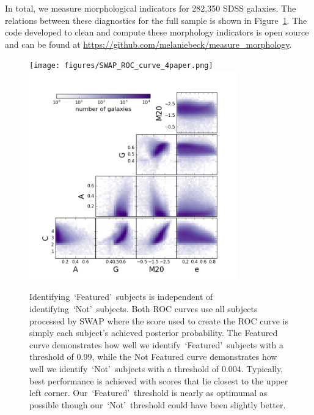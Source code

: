 \documentclass[twocolumn]{aastex6}
\newcommand{\feat}{`Featured'}
\newcommand{\notfeat}{`Not'}
\begin{document}
In total, we measure morphological indicators for 282,350 SDSS galaxies. The relations between these diagnostics for the full sample is shown in Figure~\ref{fig: morph thresh}. The code developed to clean and compute these morphology indicators is open source and can be found at \url{https://github.com/melaniebeck/measure_morphology}.

\begin{figure}[t!]

\texttt{[image: figures/SWAP\_ROC\_curve\_4paper.png]}
\includegraphics[width=3.55in]{figures/morph_params_entire_GZ2_sample.png}
\caption{Identifying~\feat~subjects is independent of identifying~\notfeat~subjects.  Both ROC curves use all subjects processed by SWAP where the score used to create the ROC curve is simply each subject's achieved posterior probability. The Featured curve demonstrates how well we identify~\feat~subjects with a threshold of 0.99, while the Not Featured curve demonstrates how well we identify~\notfeat~subjects with a threshold of 0.004. Typically, best performance is achieved with scores that lie closest to the upper left corner.  Our~\feat~threshold is nearly as optimumal as possible though our~\notfeat~threshold could have been slightly better. \label{fig: retirement thresholds}}
\label{fig: morph thresh}
\end{figure}
\end{document}
